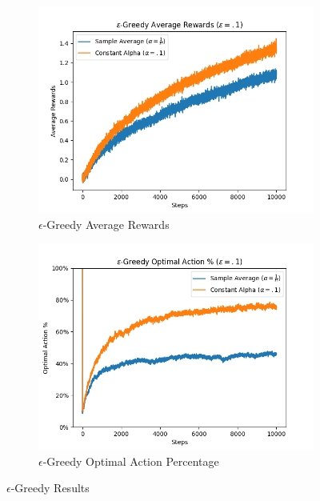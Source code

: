 \documentclass{article}
\begin{document}
\begin{figure}[ht]

\begin{subfigure}{0.5\textwidth}
\includegraphics[scale=0.4]{epsilon_greedy_average_rewards.png} 
\caption{$\epsilon$-Greedy Average Rewards}
\label{fig:epsilon-greedy average rewards}
\end{subfigure}
\begin{subfigure}{0.5\textwidth}
\includegraphics[scale=0.4]{epsilon_greedy_optimal_action_pct.png}
\caption{$\epsilon$-Greedy Optimal Action Percentage}
\label{fig:epsilon-greedy optimal action pct}
\end{subfigure}
\caption{$\epsilon$-Greedy Results}
\end{figure}
\end{document}
